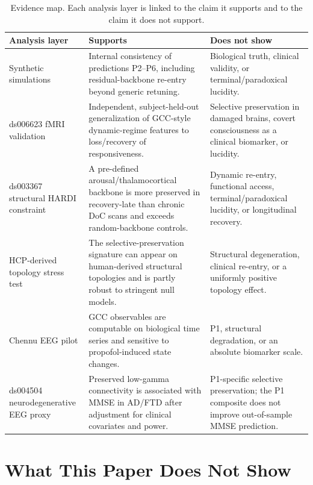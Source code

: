 \documentclass[11pt,a4paper]{article}
\theoremstyle{plain}
\theoremstyle{definition}
\theoremstyle{remark}
\begin{document}
\begin{table}[h]
\centering
\caption{Evidence map. Each analysis layer is linked to the claim it supports and to the claim it does not support.}
\label{tab:evidence-map}
\small
\begin{tabular}{p{3.1cm}p{4.2cm}p{5.4cm}}
\hline
Analysis layer & Supports & Does not show \\
\hline
Synthetic simulations & Internal consistency of predictions P2--P6, including residual-backbone re-entry beyond generic retuning. & Biological truth, clinical validity, or terminal/paradoxical lucidity. \\
ds006623 fMRI validation & Independent, subject-held-out generalization of GCC-style dynamic-regime features to loss/recovery of responsiveness. & Selective preservation in damaged brains, covert consciousness as a clinical biomarker, or lucidity. \\
ds003367 structural HARDI constraint & A pre-defined arousal/thalamocortical backbone is more preserved in recovery-late than chronic DoC scans and exceeds random-backbone controls. & Dynamic re-entry, functional access, terminal/paradoxical lucidity, or longitudinal recovery. \\
HCP-derived topology stress test & The selective-preservation signature can appear on human-derived structural topologies and is partly robust to stringent null models. & Structural degeneration, clinical re-entry, or a uniformly positive topology effect. \\
Chennu EEG pilot & GCC observables are computable on biological time series and sensitive to propofol-induced state changes. & P1, structural degradation, or an absolute biomarker scale. \\
ds004504 neurodegenerative EEG proxy & Preserved low-gamma connectivity is associated with MMSE in AD/FTD after adjustment for clinical covariates and power. & P1-specific selective preservation; the P1 composite does not improve out-of-sample MMSE prediction. \\
\hline
\end{tabular}
\end{table}

\section{What This Paper Does Not Show}
\label{sec:not-show}
\end{document}

